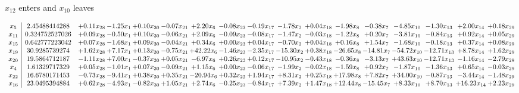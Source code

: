 \documentclass[9pt]{article}
\begin{document}
 $ x_{12} $ enters and $ x_{10} $ leaves 

 \[\begin{array}{c| c c@{\hskip 2pt} c@{\hskip 2pt} c@{\hskip 2pt} c@{\hskip 2pt} c@{\hskip 2pt} c@{\hskip 2pt} c@{\hskip 2pt} c@{\hskip 2pt} c@{\hskip 2pt} c@{\hskip 2pt} c@{\hskip 2pt} c@{\hskip 2pt} c@{\hskip 2pt} c@{\hskip 2pt} c@{\hskip 2pt} }
 x_{5}   &  2.45488414288 & +  0.11 x_{28} & -1.25 x_{1} & +  0.10 x_{30} & -0.07 x_{21} & +  2.20 x_{6} & -0.08 x_{23} & -0.19 x_{17} & -1.78 x_{2} & +  0.04 x_{18} & -1.98 x_{8} & -0.38 x_{7} & -4.85 x_{10} & -1.30 x_{13} & +  2.00 x_{14} & +  0.18 x_{29}\\
 x_{11}   &  0.324752527026 & +  0.09 x_{28} & -0.50 x_{1} & +  0.10 x_{30} & -0.06 x_{21} & +  2.09 x_{6} & -0.09 x_{23} & -0.08 x_{17} & -1.47 x_{2} & -0.03 x_{18} & -1.22 x_{8} & +  0.20 x_{7} & -3.81 x_{10} & -0.84 x_{13} & +  0.92 x_{14} & +  0.05 x_{29}\\
 x_{15}   &  0.642777223042 & +  0.07 x_{28} & -1.68 x_{1} & +  0.09 x_{30} & -0.04 x_{21} & +  0.34 x_{6} & +  0.00 x_{23} & +  0.04 x_{17} & -0.70 x_{2} & +  0.04 x_{18} & +  0.16 x_{8} & +  1.54 x_{7} & -1.68 x_{10} & -0.18 x_{13} & +  0.37 x_{14} & +  0.08 x_{29}\\
 x_{19}   &  30.9285739274 & +  1.62 x_{28} & +  7.17 x_{1} & +  0.13 x_{30} & -0.75 x_{21} & + 42.22 x_{6} & -1.46 x_{23} & -2.35 x_{17} & -15.30 x_{2} & +  0.38 x_{18} & -26.65 x_{8} & -14.81 x_{7} & -54.72 x_{10} & -12.71 x_{13} & +  8.78 x_{14} & +  1.62 x_{29}\\
 x_{20}   &  19.5864712187 & -1.11 x_{28} & +  7.00 x_{1} & -0.37 x_{30} & +  0.05 x_{21} & -6.97 x_{6} & +  0.26 x_{23} & +  0.12 x_{17} & -10.95 x_{2} & -0.43 x_{18} & -0.36 x_{8} & -3.13 x_{7} & + 43.63 x_{10} & -12.71 x_{13} & -1.16 x_{14} & -2.79 x_{29}\\
 x_{4}   &  1.61329717329 & +  0.05 x_{28} & -1.01 x_{1} & +  0.07 x_{30} & -0.09 x_{21} & +  1.15 x_{6} & +  0.00 x_{23} & -0.06 x_{17} & -1.99 x_{2} & -0.02 x_{18} & -1.59 x_{8} & +  0.92 x_{7} & -1.87 x_{10} & -1.36 x_{13} & +  0.65 x_{14} & -0.03 x_{29}\\
 x_{22}   &  16.6780171453 & -0.73 x_{28} & -9.41 x_{1} & +  0.38 x_{30} & +  0.35 x_{21} & -20.94 x_{6} & +  0.32 x_{23} & +  1.94 x_{17} & +  8.31 x_{2} & +  0.25 x_{18} & + 17.98 x_{8} & +  7.82 x_{7} & + 34.00 x_{10} & -0.87 x_{13} & -3.44 x_{14} & -1.48 x_{29}\\
 x_{16}   &  23.0495394884 & +  0.62 x_{28} & -4.93 x_{1} & -0.82 x_{30} & +  1.05 x_{21} & +  2.74 x_{6} & -0.25 x_{23} & -0.84 x_{17} & +  7.39 x_{2} & +  1.47 x_{18} & + 12.44 x_{8} & -15.45 x_{7} & +  8.33 x_{10} & +  8.70 x_{13} & + 16.23 x_{14} & +  2.23 x_{29}\\

\end{array}\]
\end{document}
